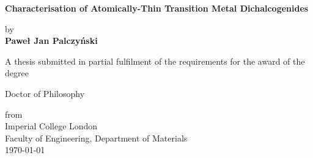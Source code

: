 \begin{titlepage}
	\begin{center}
		\begin{Large}
		\vspace*{4cm}
		
		\textbf{Characterisation of Atomically-Thin Transition Metal Dichalcogenides}\\
		\vspace{0.5cm}
		\end{Large}
		
		\vspace{0.5cm}
		by\\
		\vspace{0.5cm}
		\large{\textbf{Paweł Jan Palczyński}}
		\vspace{0.5cm}
		
		\small{A thesis submitted in partial fulfilment of the requirements for the award of the degree}\\
		\vspace{0.5cm}
		\begin{normalsize}
		\large{Doctor of Philosophy}\\
		\end{normalsize}
		\vspace{0.5cm}
		from\\
		\vspace{0.5cm}
		\large{Imperial College London}\\
		\vfill
		Faculty of Engineering, Department of Materials\\
		\today
	\end{center}
\end{titlepage}